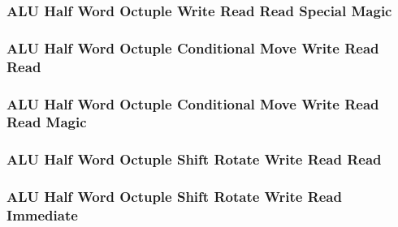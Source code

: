 

\subsubsection[{\small ALU Half Word Octuple Write Read Read Special Magic}]{ALU Half Word Octuple Write Read Read Special Magic} \label{sec:format-ALU-HOWRRS.M}



\subsubsection[{\small ALU Half Word Octuple Conditional Move Write Read Read}]{ALU Half Word Octuple Conditional Move Write Read Read} \label{sec:format-ALU-HOCMWRR}



\subsubsection[{\small ALU Half Word Octuple Conditional Move Write Read Read Magic}]{ALU Half Word Octuple Conditional Move Write Read Read Magic} \label{sec:format-ALU-HOCMWRR.M}



\subsubsection[{\small ALU Half Word Octuple Shift Rotate Write Read Read}]{ALU Half Word Octuple Shift Rotate Write Read Read} \label{sec:format-ALU-HOSWRR}



\subsubsection[{\small ALU Half Word Octuple Shift Rotate Write Read Immediate}]{ALU Half Word Octuple Shift Rotate Write Read Immediate} \label{sec:format-ALU-HOSWRI}


